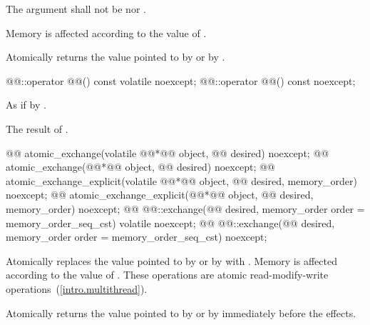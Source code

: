\begin{itemdescr}
\pnum
\requires The  argument shall not be  nor .

\pnum
\effects Memory is affected according to the value of .

\pnum
\returns Atomically returns the value pointed to by  or by .
\end{itemdescr}

%
%
%
\begin{itemdecl}
@@::operator @@() const volatile noexcept;
@@::operator @@() const noexcept;
\end{itemdecl}

\begin{itemdescr}
\pnum
\effects As if by .

\pnum
\returns The result of .
\end{itemdescr}


%
%
%
%
%
\begin{itemdecl}
@@ atomic_exchange(volatile @@*@\itcorr[-1]@ object, @@ desired) noexcept;
@@ atomic_exchange(@@*@\itcorr[-1]@ object, @@ desired) noexcept;
@@ atomic_exchange_explicit(volatile @@*@\itcorr[-1]@ object, @@ desired, memory_order) noexcept;
@@ atomic_exchange_explicit(@@*@\itcorr[-1]@ object, @@ desired, memory_order) noexcept;
@@ @@::exchange(@@ desired, memory_order order = memory_order_seq_cst) volatile noexcept;
@@ @@::exchange(@@ desired, memory_order order = memory_order_seq_cst) noexcept;
\end{itemdecl}

\begin{itemdescr}
\pnum
\effects Atomically replaces the value pointed to by  or by 
with .
Memory is affected according to the value of .
These operations are atomic read-modify-write operations~(\ref{intro.multithread}).

\pnum
\returns Atomically returns the value pointed to by  or by  immediately before the effects.
\end{itemdescr}

